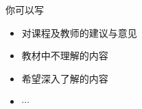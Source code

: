 \documentclass[a4paper, justified]{tufte-handout}
\begin{document}



\beginfb

你可以写
\begin{itemize}
  \item 对课程及教师的建议与意见
  \item 教材中不理解的内容
  \item 希望深入了解的内容
  \item $\cdots$
\end{itemize}
\end{document}
